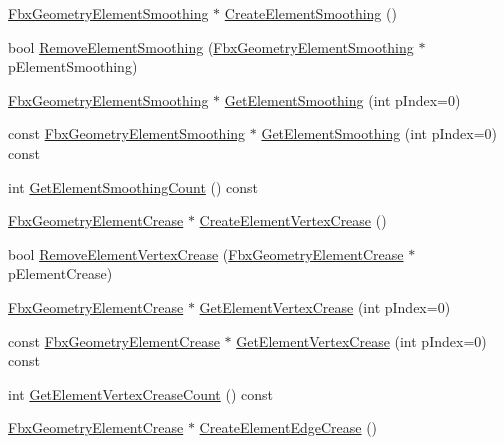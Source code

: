 \begin{DoxyCompactItemize}
\item 
\hyperlink{fbxlayer_8h_a6a651170dec994ac83db90645d9ecfd3}{Fbx\+Geometry\+Element\+Smoothing} $\ast$ \hyperlink{class_fbx_geometry_base_a998f217dc7383a3fdd5bd4269d424fe3}{Create\+Element\+Smoothing} ()
\item 
bool \hyperlink{class_fbx_geometry_base_a55da601b539c3e1c933fb1b3f053e1ca}{Remove\+Element\+Smoothing} (\hyperlink{fbxlayer_8h_a6a651170dec994ac83db90645d9ecfd3}{Fbx\+Geometry\+Element\+Smoothing} $\ast$p\+Element\+Smoothing)
\item 
\hyperlink{fbxlayer_8h_a6a651170dec994ac83db90645d9ecfd3}{Fbx\+Geometry\+Element\+Smoothing} $\ast$ \hyperlink{class_fbx_geometry_base_a6ba008301dd152eef938f18fc87ff385}{Get\+Element\+Smoothing} (int p\+Index=0)
\item 
const \hyperlink{fbxlayer_8h_a6a651170dec994ac83db90645d9ecfd3}{Fbx\+Geometry\+Element\+Smoothing} $\ast$ \hyperlink{class_fbx_geometry_base_a0a464128150ff6eee48b6913b22a1c49}{Get\+Element\+Smoothing} (int p\+Index=0) const
\item 
int \hyperlink{class_fbx_geometry_base_a65ce50bb6548a0c1cc3a237b1f953242}{Get\+Element\+Smoothing\+Count} () const
\item 
\hyperlink{fbxlayer_8h_aa1db71d39153856548f192cf52aa2cc5}{Fbx\+Geometry\+Element\+Crease} $\ast$ \hyperlink{class_fbx_geometry_base_ac31ccf6da5d91b8df915bb1ace15e399}{Create\+Element\+Vertex\+Crease} ()
\item 
bool \hyperlink{class_fbx_geometry_base_a01fe726448c9362a399148aceb051f71}{Remove\+Element\+Vertex\+Crease} (\hyperlink{fbxlayer_8h_aa1db71d39153856548f192cf52aa2cc5}{Fbx\+Geometry\+Element\+Crease} $\ast$p\+Element\+Crease)
\item 
\hyperlink{fbxlayer_8h_aa1db71d39153856548f192cf52aa2cc5}{Fbx\+Geometry\+Element\+Crease} $\ast$ \hyperlink{class_fbx_geometry_base_a2ba68cd342357a08aceae046aba944d4}{Get\+Element\+Vertex\+Crease} (int p\+Index=0)
\item 
const \hyperlink{fbxlayer_8h_aa1db71d39153856548f192cf52aa2cc5}{Fbx\+Geometry\+Element\+Crease} $\ast$ \hyperlink{class_fbx_geometry_base_aa54ec0641f415576fd7e09753df8fa0d}{Get\+Element\+Vertex\+Crease} (int p\+Index=0) const
\item 
int \hyperlink{class_fbx_geometry_base_afc099f60d6c45cbac000b10d95c83377}{Get\+Element\+Vertex\+Crease\+Count} () const
\item 
\hyperlink{fbxlayer_8h_aa1db71d39153856548f192cf52aa2cc5}{Fbx\+Geometry\+Element\+Crease} $\ast$ \hyperlink{class_fbx_geometry_base_ae5475b4e64c7fa7a9c3c1edd3365d53f}{Create\+Element\+Edge\+Crease} ()

\end{DoxyCompactItemize}
